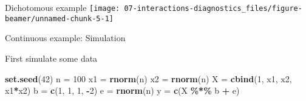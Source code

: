 \documentclass[
  ignorenonframetext,
]{beamer}
\newenvironment{Shaded}{\begin{snugshade}}{\end{snugshade}}
\newcommand{\DecValTok}[1]{\textcolor[rgb]{0.00,0.00,0.81}{#1}}
\newcommand{\FunctionTok}[1]{\textcolor[rgb]{0.13,0.29,0.53}{\textbf{#1}}}
\newcommand{\NormalTok}[1]{#1}
\newcommand{\OtherTok}[1]{\textcolor[rgb]{0.56,0.35,0.01}{#1}}
\newcommand{\SpecialCharTok}[1]{\textcolor[rgb]{0.81,0.36,0.00}{\textbf{#1}}}
\begin{document}
\begin{frame}{Dichotomous example}
\protect\hypertarget{dichotomous-example}{}
\texttt{[image: 07-interactions-diagnostics\_files/figure-beamer/unnamed-chunk-5-1]}
\end{frame}

\begin{frame}[fragile]{Continuous example: Simulation}
\protect\hypertarget{continuous-example-simulation}{}
\pause

First simulate some data

\begin{Shaded}
\begin{Highlighting}[]
\FunctionTok{set.seed}\NormalTok{(}\DecValTok{42}\NormalTok{)}
\NormalTok{n  }\OtherTok{=} \DecValTok{100}
\NormalTok{x1 }\OtherTok{=} \FunctionTok{rnorm}\NormalTok{(n)}
\NormalTok{x2 }\OtherTok{=} \FunctionTok{rnorm}\NormalTok{(n)}
\NormalTok{X  }\OtherTok{=} \FunctionTok{cbind}\NormalTok{(}\DecValTok{1}\NormalTok{, x1, x2, x1}\SpecialCharTok{*}\NormalTok{x2)}
\NormalTok{b  }\OtherTok{=} \FunctionTok{c}\NormalTok{(}\DecValTok{1}\NormalTok{, }\DecValTok{1}\NormalTok{, }\DecValTok{1}\NormalTok{, }\SpecialCharTok{{-}}\DecValTok{2}\NormalTok{)}
\NormalTok{e  }\OtherTok{=} \FunctionTok{rnorm}\NormalTok{(n)}
\NormalTok{y  }\OtherTok{=} \FunctionTok{c}\NormalTok{(X }\SpecialCharTok{\%*\%}\NormalTok{ b }\SpecialCharTok{+}\NormalTok{ e)}
\end{Highlighting}
\end{Shaded}
\end{frame}
\end{document}
